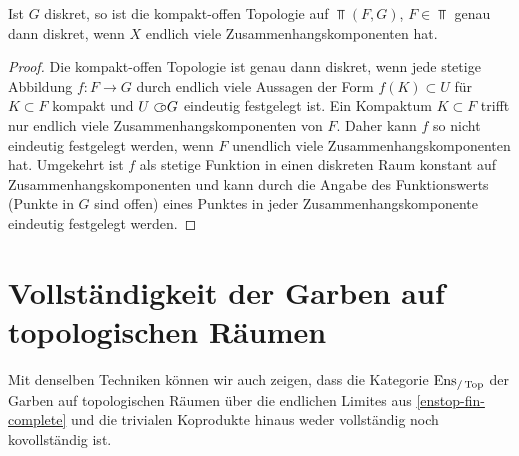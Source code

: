 \begin{lemma} \label{compact-open-discrete}
  Ist $G$ diskret, so ist die kompakt-offen Topologie auf $\Top(F,
  G)$, $F \in \Top$ genau dann diskret, wenn $X$ endlich viele
  Zusammenhangskomponenten hat.
\end{lemma}
\begin{proof}
  Die kompakt-offen Topologie ist genau dann diskret, wenn jede
  stetige Abbildung $f: F \to G$ durch endlich viele Aussagen der Form
  $f(K) \subset U$ für $K \subset F$ kompakt und $U \subset\kern-0.58em\circ G$ eindeutig
  festgelegt ist. Ein Kompaktum $K \subset F$ trifft nur endlich viele
  Zusammenhangskomponenten von $F$. Daher kann $f$ so nicht eindeutig
  festgelegt werden, wenn $F$ unendlich viele Zusammenhangskomponenten
  hat. Umgekehrt ist $f$ als stetige Funktion in einen diskreten Raum
  konstant auf Zusammenhangskomponenten und kann durch die Angabe des
  Funktionswerts (Punkte in $G$ sind offen) eines Punktes in jeder
  Zusammenhangskomponente eindeutig festgelegt werden.
\end{proof}

\section[Vollständigkeit der Garben auf topologischen Räumen]
        {Vollständigkeit der Garben auf topologischen Räumen
        }
        \label{sec:enstop-completeness}

Mit denselben Techniken können wir auch zeigen, dass die Kategorie
$\operatorname{Ens}_{/\operatorname{Top}}$ der Garben auf topologischen Räumen über die endlichen
Limites aus \ref{enstop-fin-complete} und die trivialen Koprodukte
hinaus weder vollständig noch kovollständig ist.

